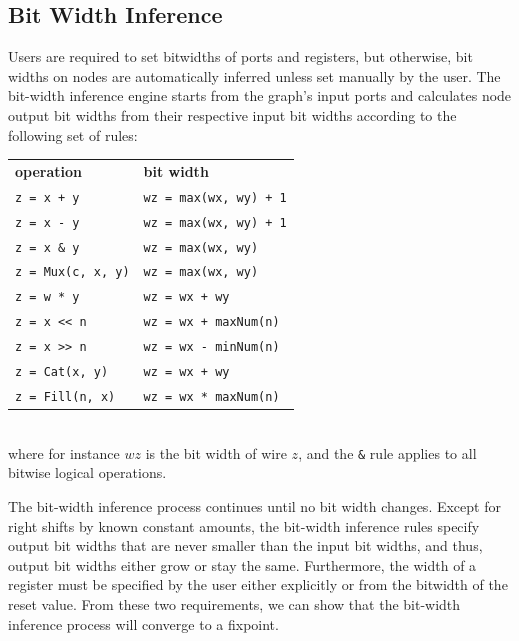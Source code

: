 \documentclass[10pt,twocolumn]{article}
\begin{document}

\subsection{Bit Width Inference}

Users are required to set bitwidths of ports and registers, but otherwise,
bit widths on nodes are automatically inferred unless set manually by the user.
The bit-width inference engine starts from the graph's input ports and 
calculates node output bit widths from their respective input bit widths according to the following set of rules:\\

{\footnotesize
\begin{tabular}{ll}
{\bf operation} & {\bf bit width} \\ 
\verb|z = x + y| & \verb|wz = max(wx, wy) + 1| \\
\verb+z = x - y+ & \verb|wz = max(wx, wy) + 1|\\
\verb+z = x & y+ & \verb+wz = max(wx, wy)+ \\
\verb+z = Mux(c, x, y)+ & \verb+wz = max(wx, wy)+ \\
\verb+z = w * y+ & \verb!wz = wx + wy! \\
\verb+z = x << n+ & \verb!wz = wx + maxNum(n)! \\
\verb+z = x >> n+ & \verb+wz = wx - minNum(n)+ \\
\verb+z = Cat(x, y)+ & \verb!wz = wx + wy! \\
\verb+z = Fill(n, x)+ & \verb+wz = wx * maxNum(n)+ \\
\end{tabular}
}
\\[1mm]
\noindent  
where for instance $wz$ is the bit width of wire $z$, and the \verb+&+
rule applies to all bitwise logical operations.

The bit-width inference process continues until no bit width changes.
Except for right shifts by known constant amounts, the bit-width
inference rules specify output bit widths that are never smaller than
the input bit widths, and thus, output bit widths either grow or stay
the same.  Furthermore, the width of a register must be specified by
the user either explicitly or from the bitwidth of the reset value.
From these two requirements, we can show that the bit-width inference
process will converge to a fixpoint.
\end{document}
